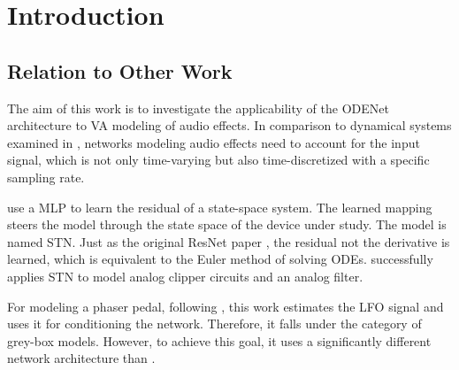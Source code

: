 \chapter{Introduction}
\label{chap:Introduction}


\section{Relation to Other Work}
\label{sec:relation_to_other_work}
The aim of this work is to investigate the applicability of the ODENet architecture to \ac{VA} modeling of audio effects. In comparison to dynamical systems examined in \cite{Karlsson2019}, networks modeling audio effects need to account for the input signal, which is not only time-varying but also time-discretized with a specific sampling rate. 

\cite{Parker2019} use a \ac{MLP} to learn the residual of a state-space system. The learned mapping steers the model through the state space of the device under study. The model is named \ac{STN}. Just as the original \ac{ResNet} paper \cite{He2015}, the residual not the derivative is learned, which is equivalent to the Euler method of solving \acp{ODE}. \cite{Parker2019} successfully applies \ac{STN} to model analog clipper circuits and an analog filter.

For modeling a phaser pedal, following \cite{Wright2020}, this work estimates the \ac{LFO} signal and uses it for conditioning the network. Therefore, it falls under the category of grey-box models. However, to achieve this goal, it uses a significantly different network architecture than \cite{Wright2020}.


